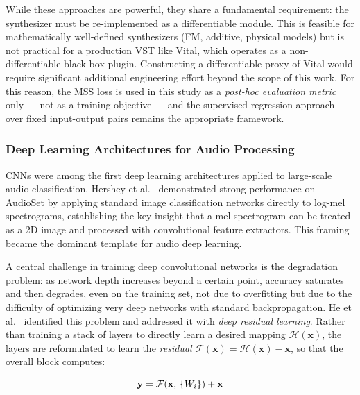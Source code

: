 \noindent While these approaches are powerful, they share a fundamental requirement: the synthesizer must be re-implemented as a differentiable module. This is feasible for mathematically well-defined synthesizers (FM, additive, physical models) but is not practical for a production VST like Vital, which operates as a non-differentiable black-box plugin. Constructing a differentiable proxy of Vital would require significant additional engineering effort beyond the scope of this work. For this reason, the MSS loss is used in this study as a \textit{post-hoc evaluation metric} only — not as a training objective — and the supervised regression approach over fixed input-output pairs remains the appropriate framework.

\subsubsection{Deep Learning Architectures for Audio Processing}

CNNs were among the first deep learning architectures applied to large-scale audio classification. Hershey et al.\ \cite{hershey2017cnn} demonstrated strong performance on AudioSet by applying standard image classification networks directly to log-mel spectrograms, establishing the key insight that a mel spectrogram can be treated as a 2D image and processed with convolutional feature extractors. This framing became the dominant template for audio deep learning.

\par \vspace{0.3cm}

\noindent A central challenge in training deep convolutional networks is the degradation problem: as network depth increases beyond a certain point, accuracy saturates and then degrades, even on the training set, not due to overfitting but due to the difficulty of optimizing very deep networks with standard backpropagation. He et al.\ \cite{he2016resnet} identified this problem and addressed it with \textit{deep residual learning}. Rather than training a stack of layers to directly learn a desired mapping $\mathcal{H}(\mathbf{x})$, the layers are reformulated to learn the \textit{residual} $\mathcal{F}(\mathbf{x}) = \mathcal{H}(\mathbf{x}) - \mathbf{x}$, so that the overall block computes:

\begin{equation}
  \mathbf{y} = \mathcal{F}(\mathbf{x},\, \{W_i\}) + \mathbf{x}
  \label{eq:residual}\eqname{Residual learning block}
\end{equation}

